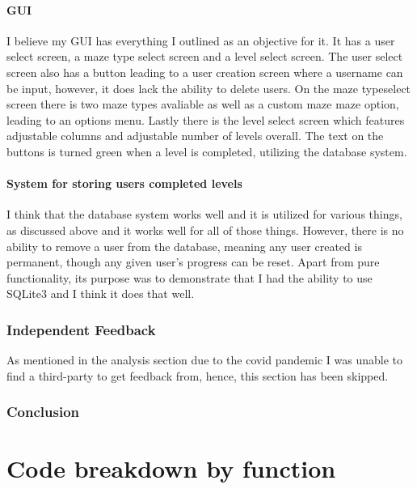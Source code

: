 \documentclass{article}
\begin{document}
\subsection{GUI}
I believe my GUI has everything I outlined as an objective for it. It has a user select screen, a maze type select screen and a level select screen. The user select screen also has a button leading to a user creation screen where a username can be input, however, it does lack the ability to delete users. On the maze typeselect screen there is two maze types avaliable as well as a custom
 maze maze option, leading to an options menu. Lastly there is the level select screen which features adjustable columns and adjustable number of levels overall. The text on the buttons is 
turned green when a level is completed, utilizing the database system.

\subsection{System for storing users completed levels}
I think that the database system works well and it is utilized for various things, as discussed above and it works well for all of those things. However, there is no ability to remove a user from the database, meaning any user created is permanent, though any given user's progress can be reset. Apart from pure functionality, its purpose was to demonstrate that I had the ability to use
SQLite3 and I think it does that well.
\clearpage

\section{Independent Feedback}
As mentioned in the analysis section due to the covid pandemic I was unable to find a third-party to get feedback from, hence, this section has been skipped.
\section{Conclusion}


\clearpage
\part{Code breakdown by function}
\end{document}
